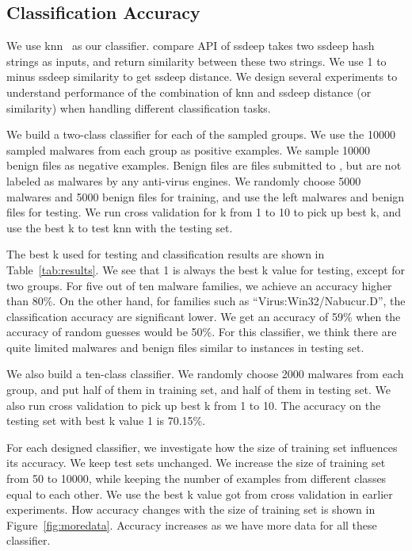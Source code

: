 \subsection{Classification Accuracy}


We use knn~\cite{knn} as our classifier.
compare API of ssdeep takes two ssdeep hash strings as inputs, 
and return similarity between these two strings. 
We use 1 to minus ssdeep similarity to get ssdeep distance.  
We design several experiments to understand performance of 
the combination of knn and ssdeep 
distance (or similarity) when handling different classification tasks. 


We build a two-class classifier for each of the sampled groups. 
We use the 10000 sampled malwares from each group as positive examples. 
We sample 10000 benign files as negative examples. 
Benign files are files submitted to \vt{}, but are not labeled as malwares by any anti-virus engines. 
We randomly choose 5000 malwares and 5000 benign files for training, 
and use the left malwares and benign files for testing. 
We run cross validation for k from 1 to 10 to pick up best k, 
and use the best k to test knn with the testing set. 

The best k used for testing and classification results are shown in Table~\ref{tab:results}.
We see that 1 is always the best k value for testing, except for two groups.
For five out of
ten malware families, we achieve an accuracy higher than 80\%.
On the other hand, for
families such as ``Virus:Win32/Nabucur.D'',
the classification accuracy are significant
lower. We get an accuracy of 59\% when
the accuracy of random guesses would be 50\%.
For this classifier, we think there are quite limited malwares and benign files similar to instances in testing set. 

We also build a ten-class classifier.
We randomly choose 2000 malwares from each group, 
and put half of them in training set, and half of them in testing set. 
We also run cross validation to pick up best k from 1 to 10. 
The accuracy on the testing set with best k value 1 is 70.15\%. 





For each designed classifier, we investigate 
how the size of training set influences its accuracy.
We keep test sets unchanged.  
We increase the size of training set from 50 to 10000, 
while keeping the number of examples from different classes equal to each other.  
We use the best k value got from cross validation in earlier experiments.
How accuracy changes with the size of training set is shown in Figure~\ref{fig:moredata}. 
Accuracy increases as we have more data for all these classifier. 

